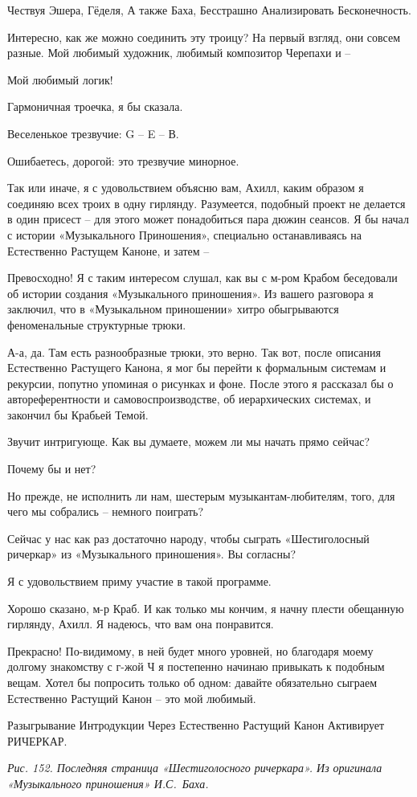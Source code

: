 \documentclass[../main.tex]{subfiles}
\begin{document}
\begin{dialogue}
 Чествуя Эшера, Гёделя, А также Баха, Бесстрашно Анализировать Бесконечность.

 Интересно, как же можно соединить эту троицу? На первый взгляд, они совсем разные. Мой любимый художник, любимый композитор Черепахи и \---

 Мой любимый логик!

 Гармоничная троечка, я бы сказала.

 Веселенькое трезвучие: G \--- E \--- В.

 Ошибаетесь, дорогой: это трезвучие минорное.

 Так или иначе, я с удовольствием объясню вам, Ахилл, каким образом я соединяю всех троих в одну гирлянду. Разумеется, подобный проект не делается в один присест \--- для этого может понадобиться пара дюжин сеансов. Я бы начал с истории «Музыкального Приношения», специально останавливаясь на Естественно Растущем Каноне, и затем \---

 Превосходно! Я с таким интересом слушал, как вы с м-ром Крабом беседовали об истории создания «Музыкального приношения». Из вашего разговора я заключил, что в «Музыкальном приношении» хитро обыгрываются феноменальные структурные трюки.

 А-а, да. Там есть разнообразные трюки, это верно. Так вот, после описания Естественно Растущего Канона, я мог бы перейти к формальным системам и рекурсии, попутно упоминая о рисунках и фоне. После этого я рассказал бы о автореферентности и самовоспроизводстве, об иерархических системах, и закончил бы Крабьей Темой.

 Звучит интригующе. Как вы думаете, можем ли мы начать прямо сейчас?

 Почему бы и нет?

 Но прежде, не исполнить ли нам, шестерым музыкантам-любителям, того, для чего мы собрались \--- немного поиграть?

 Сейчас у нас как раз достаточно народу, чтобы сыграть «Шестиголосный ричеркар» из «Музыкального приношения». Вы согласны?

 Я с удовольствием приму участие в такой программе.

 Хорошо сказано, м-р Краб. И как только мы кончим, я начну плести обещанную гирлянду, Ахилл. Я надеюсь, что вам она понравится.

 Прекрасно! По-видимому, в ней будет много уровней, но благодаря моему долгому знакомству с г-жой Ч я постепенно начинаю привыкать к подобным вещам. Хотел бы попросить только об одном: давайте обязательно сыграем Естественно Растущий Канон \--- это мой любимый.

 Разыгрывание Интродукции Через Естественно Растущий Канон Активирует РИЧЕРКАР.

\emph{Рис. 152. Последняя страница «Шестиголосного ричеркара». Из оригинала «Музыкального приношения» И.С.~Баха.}

\end{dialogue}
\end{document}
